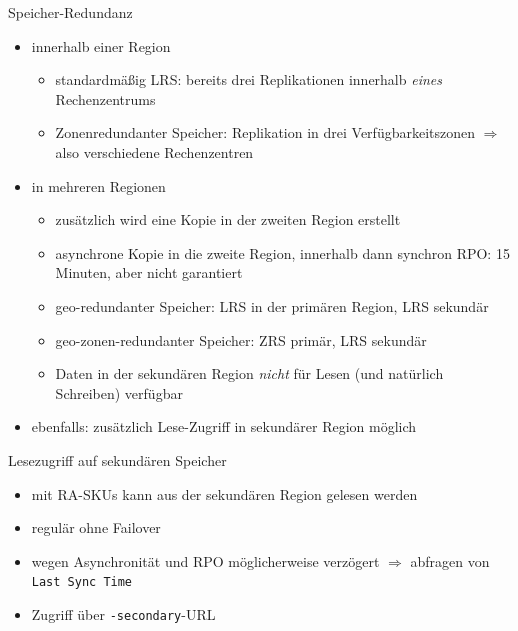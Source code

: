 \begin{flashcard}[]{Speicher-Redundanz}
  \begin{itemize}
    \item innerhalb einer Region
      \begin{itemize}
        \item standardmäßig LRS: bereits drei Replikationen innerhalb \emph{eines} Rechenzentrums
        \item Zonenredundanter Speicher: Replikation in drei Verfügbarkeitszonen\newline
          $\Rightarrow$ also verschiedene Rechenzentren
      \end{itemize}
    \item in mehreren Regionen
      \begin{itemize}
        \item zusätzlich wird eine Kopie in der zweiten Region erstellt
        \item asynchrone Kopie in die zweite Region, innerhalb dann synchron\newline
          RPO: 15 Minuten, aber nicht garantiert
        \item geo-redundanter Speicher: LRS in der primären Region, LRS sekundär
        \item geo-zonen-redundanter Speicher: ZRS primär, LRS sekundär
        \item Daten in der sekundären Region \emph{nicht} für Lesen (und natürlich Schreiben) verfügbar
      \end{itemize}
    \item ebenfalls: zusätzlich Lese-Zugriff in sekundärer Region möglich
  \end{itemize}
\end{flashcard}

\begin{flashcard}[]{Lesezugriff auf sekundären Speicher}
  \begin{itemize}
    \item mit RA-SKUs kann aus der sekundären Region gelesen werden
    \item regulär ohne Failover
    \item[!] wegen Asynchronität und RPO möglicherweise verzögert\newline
      $\Rightarrow$ abfragen von \texttt{Last Sync Time}
    \item Zugriff über \texttt{-secondary}-URL
  \end{itemize}
\end{flashcard}

